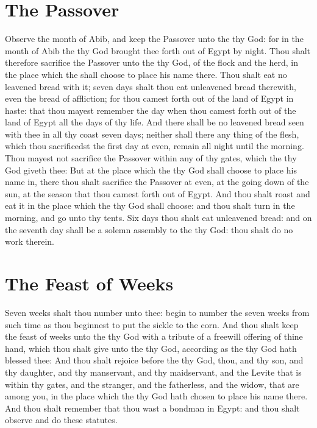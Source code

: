 \section*{The Passover}
\begin{biblechapter} %
\verse Observe the month of Abib, and keep the Passover unto the \LORD thy God: for in the month of Abib the \LORD thy God brought thee forth out of Egypt by night.
\verse Thou shalt therefore sacrifice the Passover unto the \LORD thy God, of the flock and the herd, in the place which the \LORD shall choose to place his name there.
\verse Thou shalt eat no leavened bread with it; seven days shalt thou eat unleavened bread therewith, even the bread of affliction; for thou camest forth out of the land of Egypt in haste: that thou mayest remember the day when thou camest forth out of the land of Egypt all the days of thy life.
\verse And there shall be no leavened bread seen with thee in all thy coast seven days; neither shall there any thing of the flesh, which thou sacrificedst the first day at even, remain all night until the morning.
\verse Thou mayest not sacrifice the Passover within any of thy gates, which the \LORD thy God giveth thee:
\verse But at the place which the \LORD thy God shall choose to place his name in, there thou shalt sacrifice the Passover at even, at the going down of the sun, at the season that thou camest forth out of Egypt.
\verse And thou shalt roast and eat it in the place which the \LORD thy God shall choose: and thou shalt turn in the morning, and go unto thy tents.
\verse Six days thou shalt eat unleavened bread: and on the seventh day shall be a solemn assembly to the \LORD thy God: thou shalt do no work therein.
\section*{The Feast of Weeks}
\verse Seven weeks shalt thou number unto thee: begin to number the seven weeks from such time as thou beginnest to put the sickle to the corn.
\verse And thou shalt keep the feast of weeks unto the \LORD thy God with a tribute of a freewill offering of thine hand, which thou shalt give unto the \LORD thy God, according as the \LORD thy God hath blessed thee:
\verse And thou shalt rejoice before the \LORD thy God, thou, and thy son, and thy daughter, and thy manservant, and thy maidservant, and the Levite that is within thy gates, and the stranger, and the fatherless, and the widow, that are among you, in the place which the \LORD thy God hath chosen to place his name there.
\verse And thou shalt remember that thou wast a bondman in Egypt: and thou shalt observe and do these statutes.

\end{biblechapter}
